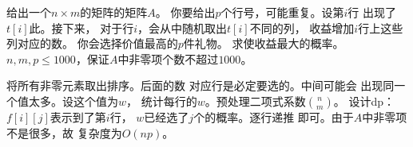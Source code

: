 \begin{prob}
	给出一个$n \times m$的矩阵的矩阵$A$。
	你要给出$p$个行号，可能重复。设第$i$行
	出现了$t[i]$此。接下来，
	对于行$i$，会从中随机取出$t[i]$不同的列，
	收益增加$i$行上这些列对应的数。
	你会选择价值最高的$p$件礼物。
	求使收益最大的概率。
	$n,m,p \le 1000$，保证$A$中非零项个数不超过$1000$。
\end{prob}

\begin{sol}
	将所有非零元素取出排序。后面的数
	对应行是必定要选的。中间可能会
	出现同一个值太多。设这个值为$w$，
	统计每行的$w$。预处理二项式系数$\binom{n}{m}$。
	设计dp：$f[i][j]$表示到了第$i$行，
	$w$已经选了$j$个的概率。逐行递推
	即可。由于$A$中非零项不是很多，故
	复杂度为$O(np)$。
\end{sol}
